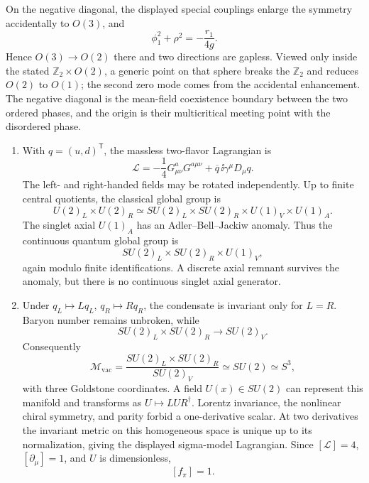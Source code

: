 \begin{enumerate}
\begin{enumerate}
\begin{enumerate}
      On the negative diagonal, the displayed special couplings enlarge the
      symmetry accidentally to \(O(3)\), and
      \[
        \phi_1^2+\rho^2=-\frac{r_1}{4g}.
      \]
      Hence \(O(3)\to O(2)\) there and two directions are gapless.  Viewed
      only inside the stated \(\mathbb Z_2\times O(2)\), a generic point on
      that sphere breaks the \(\mathbb Z_2\) and reduces \(O(2)\) to
      \(O(1)\); the second zero mode comes from the accidental enhancement.
      The negative diagonal is the mean-field coexistence boundary between
      the two ordered phases, and the origin is their multicritical meeting
      point with the disordered phase.
    \end{enumerate}
  \end{enumerate}

  \begin{enumerate}
    \item[(i)]
    With \(q=(u,d)^{\mathsf T}\), the massless two-flavor Lagrangian is
    \[
      \mathcal L=-\frac14G^a_{\mu\nu}G^{a\mu\nu}
        +\overline q\,\ii\gamma^\mu D_\mu q.
    \]
    The left- and right-handed fields may be rotated independently.  Up to
    finite central quotients, the classical global group is
    \[
      U(2)_L\times U(2)_R
        \simeq SU(2)_L\times SU(2)_R\times U(1)_V\times U(1)_A.
    \]
    The singlet axial \(U(1)_A\) has an Adler--Bell--Jackiw anomaly.  Thus the
    continuous quantum global group is
    \[
      \boxed{SU(2)_L\times SU(2)_R\times U(1)_V,}
    \]
    again modulo finite identifications.  A discrete axial remnant survives
    the anomaly, but there is no continuous singlet axial generator.

    \item[(ii)]
    Under \(q_L\mapsto Lq_L\), \(q_R\mapsto Rq_R\), the condensate is
    invariant only for \(L=R\).  Baryon number remains unbroken, while
    \[
      SU(2)_L\times SU(2)_R\longrightarrow SU(2)_V.
    \]
    Consequently
    \[
      \mathcal M_{\mathrm{vac}}
        =\frac{SU(2)_L\times SU(2)_R}{SU(2)_V}
        \simeq SU(2)\simeq S^3,
    \]
    with three Goldstone coordinates.  A field \(U(x)\in SU(2)\) can
    represent this manifold and transforms as
    \(U\mapsto LUR^\dagger\).  Lorentz invariance, the nonlinear chiral
    symmetry, and parity forbid a one-derivative scalar.  At two derivatives
    the invariant metric on this homogeneous space is unique up to its
    normalization, giving the displayed sigma-model Lagrangian.  Since
    \([\mathcal L]=4\), \([\partial_\mu]=1\), and \(U\) is dimensionless,
    \[
      \boxed{[f_\pi]=1.}
    \]


\end{enumerate}
\end{enumerate}
